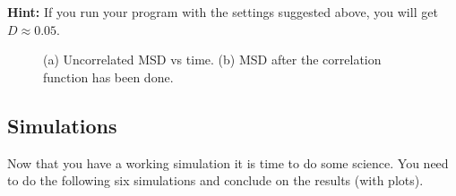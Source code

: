 \documentclass{article}
\begin{document}
\textbf{Hint:} If you run your program with the settings suggested above, you will get $D \approx 0.05$.

\begin{figure}[htb]
	\centering
  \caption{
    (a) Uncorrelated MSD vs time.
    (b) MSD after the correlation function has been done.
  }
\end{figure}

\clearpage
\newpage
\subsection{Simulations}

Now that you have a working simulation it is time to do
some science.
You need to do the following six simulations and conclude
on the results (with plots).
\end{document}
